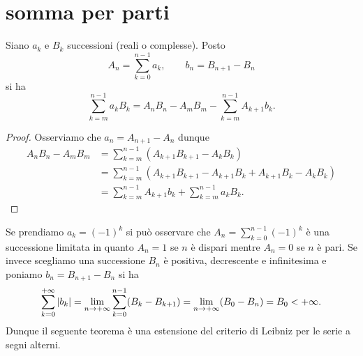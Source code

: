 \begin{comment}
\begin{corollary}[scambio delle somme]
Sia $a_{k,j}\in \CC$ una successione a due indici $k\in \NN$, $j\in\NN$.
Se 
\[
  \sum_{k=0}^{+\infty} \sum_{j=0}^{+\infty} \abs{a_{k,j}} < +\infty
\]  
allora 
\[
  \sum_{k=0}^{+\infty} \sum_{j=0}^{+\infty} a_{k,j}
  \sum_{j=0}^{+\infty} \sum_{k=0}^{+\infty} a_{k,j}
\]
\end{corollary}
%
\begin{proof}
L'ipotesi 
\[
  \sum_{k=0}^{+\infty} \sum_{j=0}^{+\infty} \abs{a_{k,j}} = S < 
\]  


data garantisce che vale anche 
\[
  \sum_{j=0}^{+\infty} \sum_{k=0}^{+\infty} \abs{a_{k,j}} < +\infty
  \]
  in quanto 
\end{proof}
\end{comment}

\section{somma per parti}
\begin{theorem}
\label{th:somma_per_parti}%
Siano $a_k$ e $B_k$ successioni (reali o complesse).
Posto
\[
  A_n = \sum_{k=0}^{n-1} a_k, \qquad
  b_n = B_{n+1} - B_n
\]
si ha
%
\begin{equation}\label{eq:somma_per_parti}
 \sum_{k=m}^{n-1} a_k B_k = A_n B_n - A_m B_m - \sum_{k=m}^{n-1} A_{k+1}b_k.
\end{equation}
\end{theorem}
%
\begin{proof}
Osserviamo che $a_n = A_{n+1}-A_n$ dunque
\begin{align*}
  A_n B_n - A_m B_m
  &= \sum_{k=m}^{n-1} (A_{k+1}B_{k+1}-A_k B_k)\\
  &= \sum_{k=m}^{n-1} (A_{k+1}B_{k+1}-A_{k+1}B_k + A_{k+1}B_k - A_k B_k)\\
  &= \sum_{k=m}^{n-1} A_{k+1}b_k + \sum_{k=m}^{n-1} a_k B_k.
\end{align*}
\end{proof}

Se prendiamo $a_k=(-1)^k$ si può osservare che $A_n = \sum_{k=0}^{n-1} (-1)^k$
è una successione limitata in quanto $A_n = 1$ se $n$ è dispari mentre
$A_n=0$ se $n$ è pari.
Se invece scegliamo una successione $B_n$ è positiva,
decrescente e infinitesima
e poniamo $b_n = B_{n+1}-B_n$
si ha
\[
  \sum_{k=0}^{+\infty} {\left|b_k\right|}
  = \lim_{n\to+\infty}\sum_{k=0}^{n-1} (B_k-B_{k+1})
  = \lim_{n\to +\infty} (B_0 - B_n) = B_0 < +\infty.
\]
Dunque il seguente teorema è una estensione del criterio
di Leibniz per le serie a segni alterni.

